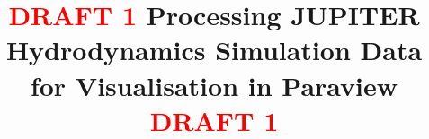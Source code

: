 \documentclass[twocolumn]{aastex62}
\begin{document}
\title{\textcolor{red}{\textbf{DRAFT 1}} Processing JUPITER Hydrodynamics Simulation Data for Visualisation in Paraview \textcolor{red}{\textbf{DRAFT 1}}}


\end{document}
